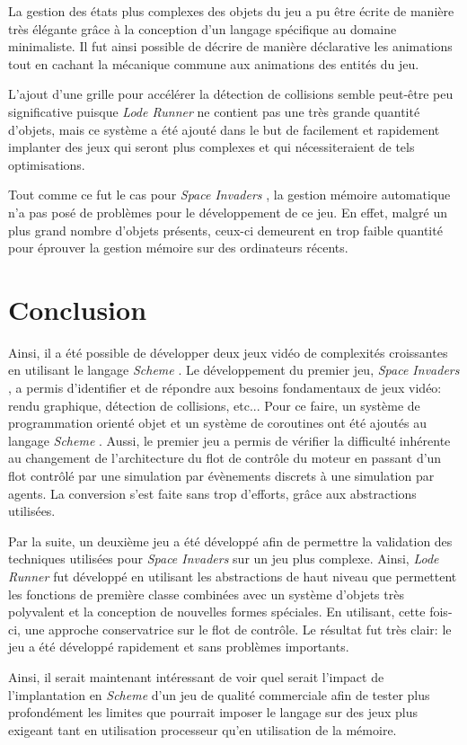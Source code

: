 \documentclass[12pt,twoside,letterpaper,francais]{book}
\newcommand{\lr}{{\textit{Lode Runner }}}
\newcommand{\si}{{\textit{Space Invaders }}}
\newcommand{\Schemelang}{{\textit{Scheme }}}
\begin{document}
La gestion des états plus complexes des objets du jeu a pu être écrite
de manière très élégante grâce à la conception d'un langage spécifique
au domaine minimaliste. Il fut ainsi possible de décrire de manière
déclarative les animations tout en cachant la mécanique commune aux
animations des entités du jeu.

L'ajout d'une grille pour accélérer la détection de collisions semble
peut-être peu significative puisque \lr ne contient pas une très
grande quantité d'objets, mais ce système a été ajouté dans le but de
facilement et rapidement implanter des jeux qui seront plus complexes
et qui nécessiteraient de tels optimisations.

Tout comme ce fut le cas pour \si, la gestion mémoire automatique n'a
pas posé de problèmes pour le développement de ce jeu. En effet,
malgré un plus grand nombre d'objets présents, ceux-ci demeurent en
trop faible quantité pour éprouver la gestion mémoire sur des
ordinateurs récents.


\FloatBarrier
\section{Conclusion}
Ainsi, il a été possible de développer deux jeux vidéo de complexités
croissantes en utilisant le langage \Schemelang. Le développement du
premier jeu, \si, a permis d'identifier et de répondre aux besoins
fondamentaux de jeux vidéo: rendu graphique, détection de collisions,
etc... Pour ce faire, un système de programmation orienté objet et un
système de coroutines ont été ajoutés au langage \Schemelang. Aussi,
le premier jeu a permis de vérifier la difficulté inhérente au
changement de l'architecture du flot de contrôle du moteur en passant
d'un flot contrôlé par une simulation par évènements discrets à une
simulation par agents. La conversion s'est faite sans trop d'efforts,
grâce aux abstractions utilisées.

Par la suite, un deuxième jeu a été développé afin de permettre la
validation des techniques utilisées pour \si sur un jeu plus
complexe. Ainsi, \lr fut développé en utilisant les abstractions de
haut niveau que permettent les fonctions de première classe combinées
avec un système d'objets très polyvalent et la conception de nouvelles
formes spéciales. En utilisant, cette fois-ci, une approche
conservatrice sur le flot de contrôle. Le résultat fut très clair: le
jeu a été développé rapidement et sans problèmes importants.

Ainsi, il serait maintenant intéressant de voir quel serait l'impact
de l'implantation en \Schemelang d'un jeu de qualité commerciale afin
de tester plus profondément les limites que pourrait imposer le
langage sur des jeux plus exigeant tant en utilisation processeur
qu'en utilisation de la mémoire.
\end{document}
